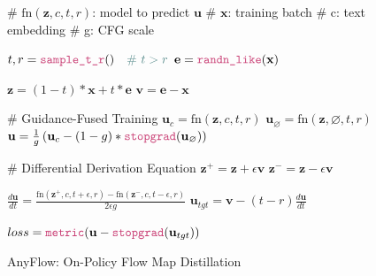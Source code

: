 \newcommand{\mycomment}[1]{\textcolor{commentcolor}{\# #1}}
\newcommand{\func}[1]{\textcolor{funccolor}{\texttt{#1}}}

\setlength{\algomargin}{0pt}
\setlength{\AlCapHSkip}{0pt}

\begin{figure}[!tb]
    \begin{minipage}{0.49\textwidth}
        \begin{algorithm}[H]
            \caption{AnyFlow: Forward Flow Map Training}
            \label{alg:flowmap}
            \SetInd{0.3em}{0.8em}
            \DontPrintSemicolon

            \mycomment{$\text{fn}(\mathbf{z}, c, t, r)$: model to predict $\mathbf{u}$} \;
            \mycomment{$\mathbf{x}$: training batch} \;
            \mycomment{c: text embedding} \;
            \mycomment{g: CFG scale} \;
            \vspace{1em}

            $t, r = \func{sample\_t\_r}() \quad\mycomment{\ t>r}$\;
            $\mathbf{e} = \func{randn\_like}(\mathbf{x})$\;
            \vspace{1em}
            
            $\mathbf{z} = (1 - t)*\mathbf{x} + t*\mathbf{e}$\;
            $\mathbf{v} = \mathbf{e} - \mathbf{x}$\;
            \vspace{1em}

            \mycomment{Guidance-Fused Training}\;
            $\mathbf{u}_c = \text{fn}(\mathbf{z}, c, t, r)$\;
            $\mathbf{u}_{\varnothing} = \text{fn}(\mathbf{z}, \varnothing, t, r)$\;
            $\mathbf{u} = \frac{1}{g}\left(\mathbf{u}_c - (1-g)*\func{stopgrad}(\mathbf{u}_{\varnothing})\right)$
            \vspace{1em}

            \mycomment{Differential Derivation Equation}\;
            $\mathbf{z}^{+} = \mathbf{z} + \epsilon\mathbf{v}$\;
            $\mathbf{z}^{-} = \mathbf{z} - \epsilon\mathbf{v}$\;

            $\frac{d\mathbf{u}}{dt} = \frac{\text{fn}(\mathbf{z}^+, c, t+\epsilon, r)-\text{fn}(\mathbf{z}^-, c, t-\epsilon, r)}{2\epsilon g}$\;
            $\mathbf{u}_{tgt} = \mathbf{v} - (t - r)\frac{d\mathbf{u}}{dt}$\;
            \vspace{1em}
            
            $loss = \func{metric}(\mathbf{u} - \func{stopgrad}(\mathbf{u}_{tgt}))$\;
        \end{algorithm}
    \end{minipage}
    \hfill
    \begin{minipage}{0.49\textwidth}
        \begin{algorithm}[H]
            \caption{AnyFlow: On-Policy Flow Map Distillation}
            \label{alg:onpolicy}
            \SetInd{0.3em}{0.8em}
            \DontPrintSemicolon


\end{algorithm}
\end{minipage}
\end{figure}
